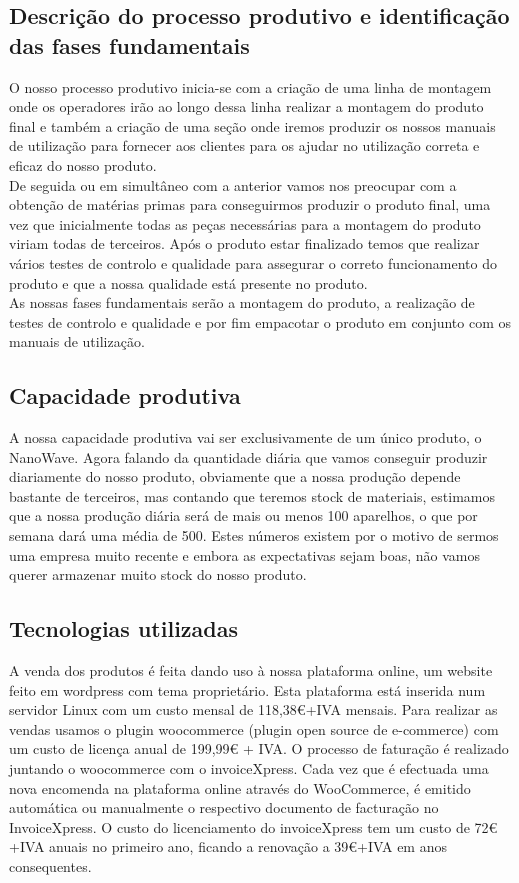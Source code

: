 \documentclass[a4paper]{article}
\begin{document}
\subsection{Descrição do processo produtivo e identificação das fases fundamentais}
O nosso processo produtivo inicia-se com a criação de uma linha de montagem onde os operadores irão ao longo dessa linha realizar a montagem do produto final e também a criação de uma seção onde iremos produzir os nossos manuais de utilização para fornecer aos clientes para os ajudar no utilização correta e eficaz do nosso produto.\\
De seguida ou em simultâneo com a anterior vamos nos preocupar com a obtenção de matérias primas para conseguirmos produzir o produto final, uma vez que inicialmente todas as peças necessárias para a montagem do produto viriam todas de terceiros. 
Após o produto estar finalizado temos que realizar vários testes de controlo e qualidade para assegurar o correto funcionamento do produto e que a nossa qualidade está presente no produto.\\
As nossas fases fundamentais serão a montagem do produto, a realização de testes de controlo e qualidade e por fim empacotar o produto em conjunto com os manuais de utilização.

\subsection{Capacidade produtiva}
A nossa capacidade produtiva vai ser exclusivamente de um único produto, o NanoWave. Agora falando da quantidade diária que vamos conseguir produzir diariamente do nosso produto, obviamente que a nossa produção depende bastante de terceiros, mas contando que teremos stock de materiais, estimamos que a nossa produção diária será de mais ou menos 100 aparelhos, o que por semana dará uma média de 500. Estes números existem por o motivo de sermos uma empresa muito recente e embora as expectativas sejam boas, não vamos querer armazenar muito stock do nosso produto.

\subsection{Tecnologias utilizadas}
A venda dos produtos é feita dando uso à nossa plataforma online, um website feito em wordpress com tema proprietário. Esta plataforma está inserida num servidor Linux com um custo mensal de 118,38€+IVA mensais. Para realizar as vendas usamos o plugin woocommerce (plugin open source de e-commerce) com um custo de licença anual de 199,99€ + IVA. O processo de faturação é realizado juntando o woocommerce com o invoiceXpress. Cada vez que é efectuada uma nova encomenda na plataforma online através do WooCommerce, é emitido automática ou manualmente o respectivo documento de facturação no InvoiceXpress. O custo do licenciamento do invoiceXpress tem um custo de 72€+IVA anuais no primeiro ano, ficando a renovação a 39€+IVA em anos consequentes.
\end{document}
